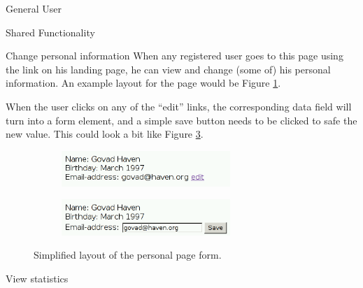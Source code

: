 \begin{section}{General User}
\begin{subsection}{Shared Functionality}
        \begin{subsubsection}{Change personal information}
            When any registered user goes to this page using the link on his
            landing page, he can view and change (some of) his personal
            information. An example layout for the page would be Figure
            \ref{img:personal}.

            When the user clicks on any of the ``edit'' links, the corresponding
            data field will turn into a form element, and a simple save button
            needs to be clicked to safe the new value. This could look a bit
            like Figure \ref{img:personal_edit}.

            \begin{figure}
                \centering
                \begin{subfigure}{0.3\textwidth}
                    \includegraphics[width=0.7\textwidth]{img/personal_u.png}
                    \label{img:personal}
                \end{subfigure}

                \begin{subfigure}{0.3\textwidth}
                    \includegraphics[width=0.7\textwidth]{img/personal_e.png}
                    \label{img:personal_edit}
                \end{subfigure}
                \caption{Simplified layout of the personal page form.}
            \end{figure}
        \end{subsubsection}

        \begin{subsubsection}{View statistics}
        \end{subsubsection}

    \end{subsection}

\end{section}


